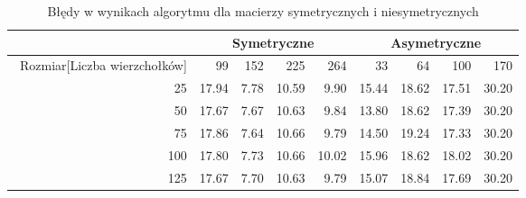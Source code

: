 \begin{table}
\begin{tabular}{|r|r|r|r|r|r|r|r|r|}
\hline
 & \multicolumn{4}{|c|}{Symetryczne} & \multicolumn{4}{|c|}{Asymetryczne} \\ \hline\
Rozmiar[Liczba wierzchołków] & 99 & 152 & 225 & 264 & 33 & 64 & 100 & 170 \\ \hline
25 & 17.94 & 7.78 & 10.59 & 9.90 & 15.44 & 18.62 & 17.51 & 30.20 \\
50 & 17.67 & 7.67 & 10.63 & 9.84 & 13.80 & 18.62 & 17.39 & 30.20 \\
75 & 17.86 & 7.64 & 10.66 & 9.79 & 14.50 & 19.24 & 17.33 & 30.20 \\
100 & 17.80 & 7.73 & 10.66 & 10.02 & 15.96 & 18.62 & 18.02 & 30.20 \\
125 & 17.67 & 7.70 & 10.63 & 9.79 & 15.07 & 18.84 & 17.69 & 30.20 \\ \hline
\end{tabular}
\caption{Błędy w wynikach algorytmu dla macierzy symetrycznych i niesymetrycznych}
\label{tab:error_TsCount}
\end{table}

